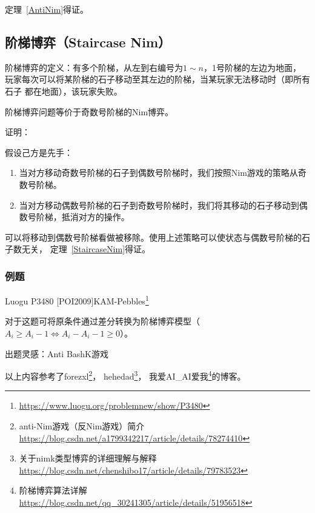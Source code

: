 定理~\ref{AntiNim}得证。

\subsection{阶梯博弈（Staircase Nim）}

阶梯博弈的定义：有多个阶梯，从左到右编号为$1\sim n$，1号阶梯的左边为地面，
玩家每次可以将某阶梯的石子移动至其左边的阶梯，当某玩家无法移动时（即所有石子
都在地面），该玩家失败。


\begin{theorem}\label{StaircaseNim}
	阶梯博弈问题等价于奇数号阶梯的Nim博弈。
\end{theorem}

证明：

假设己方是先手：

\begin{enumerate}
	\item 当对方移动奇数号阶梯的石子到偶数号阶梯时，我们按照Nim游戏的策略从奇
	数号阶梯。
	\item 当对方移动偶数号阶梯的石子到奇数号阶梯时，我们将其移动的石子移动到偶
	数号阶梯，抵消对方的操作。
\end{enumerate}

可以将移动到偶数号阶梯看做被移除。使用上述策略可以使状态与偶数号阶梯的石子数无关，
定理~\ref{StaircaseNim}得证。

\subsubsection{例题}

Luogu P3480 [POI2009]KAM-Pebbles\footnote{\url{https://www.luogu.org/problemnew/show/P3480}}

对于这题可将原条件通过差分转换为阶梯博弈模型（$A_i \geq A_i-1 \Leftrightarrow
	A_i-A_i-1 \geq 0$）。



出题灵感：Anti BashK游戏

以上内容参考了forezxl\footnote{anti-Nim游戏（反Nim游戏）简介
	\url{https://blog.csdn.net/a1799342217/article/details/78274410}}，
hehedad\footnote{关于nimk类型博弈的详细理解与解释
	\url{https://blog.csdn.net/chenshibo17/article/details/79783523}}，
我爱AI\_AI爱我\footnote{阶梯博弈算法详解
    \url{https://blog.csdn.net/qq\_30241305/article/details/51956518}}的博客。
